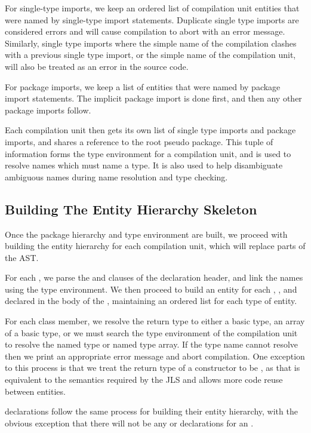 \documentclass[pdftex,11pt,a4paper]{article}
\begin{document}
For single-type imports, we keep an ordered list of compilation unit
entities that were named by single-type import statements. Duplicate
single type imports are considered errors and will cause compilation
to abort with an error message. Similarly, single type imports where
the simple name of the compilation clashes with a previous single type
import, or the simple name of the compilation unit, will also be
treated as an error in the source code.

For package imports, we keep a list of  entities that
were named by package import statements. The implicit
 package import is done first, and then any other
package imports follow.

Each compilation unit then gets its own list of single type imports
and package imports, and shares a reference to the root pseudo
package. This tuple of information forms the type environment for a
compilation unit, and is used to resolve names which must name a
type. It is also used to help disambiguate ambiguous names during name
resolution and type checking.

\subsection{Building The Entity Hierarchy Skeleton}

Once the package hierarchy and type environment are built, we proceed
with building the entity hierarchy for each compilation unit, which
will replace parts of the AST.

For each , we parse the  and 
clauses of the declaration header, and link the names using the type
environment.  We then proceed to build an entity for each
, , and  declared in the body
of the , maintaining an ordered list for each type of
entity.

For each class member, we resolve the return type to either a basic
type, an array of a basic type, or we must search the type environment
of the compilation unit to resolve the named type or named type
array. If the type name cannot resolve then we print an appropriate
error message and abort compilation. One exception to this process is
that we treat the return type of a constructor to be , as
that is equivalent to the semantics required by the JLS and allows
more code reuse between entities.

 declarations follow the same process for building
their entity hierarchy, with the obvious exception that there will not
be any  or  declarations for an
.
\end{document}
